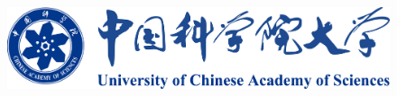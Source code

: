 \documentclass{article}
\begin{document}
\begin{figure}[H]  %
    \centering
    \includegraphics[width=0.6\linewidth]{images/title/ucas_logo 1.pdf}
    \label{fig:ucas-logo}
\end{figure}


\end{document}
